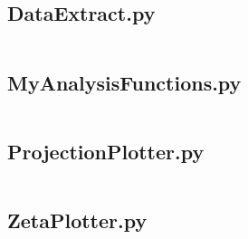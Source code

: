\subsection{DataExtract.py}
\inputminted[python3=true,bgcolor=Black,linenos=true]{python}{VNL/PythonScripts/Scripts/DataExtract.py}
\subsection{MyAnalysisFunctions.py}
\inputminted[python3=true,bgcolor=Black,linenos=true]{python}{VNL/PythonScripts/Scripts/MyAnalysisFunctions.py}
\subsection{ProjectionPlotter.py}
\inputminted[python3=true,bgcolor=Black,linenos=true]{python}{VNL/PythonScripts/Scripts/ProjectionPlotter.py}
\subsection{ZetaPlotter.py}
\inputminted[python3=true,bgcolor=Black,linenos=true]{python}{VNL/PythonScripts/Scripts/ZetaPlotter.py}

